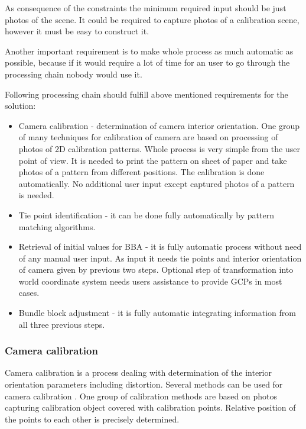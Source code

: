 \documentclass[a4paper,12pt]{article}
\begin{document}
As consequence of the constraints the minimum required input should be just photos
of the scene.
It could be required to capture photos of a calibration scene, however 
it must be easy to construct it. 

Another important requirement is to make whole process as much automatic as possible, 
because if it would require a lot of time for an user to go through the processing chain nobody would use it.


Following processing chain  \cite{labe2006automatic} should fulfill above mentioned requirements for the solution:

\begin{itemize}
\item Camera calibration - determination of camera interior orientation.  One group of many techniques for calibration
of camera are based on processing of photos of 2D calibration patterns. Whole process is very simple from the user point of view. It is needed 
to print the pattern on sheet of paper and take photos of a pattern from different positions. The calibration 
is done automatically. No additional user input except captured photos of a pattern is needed.
\item Tie point identification - it can be done fully automatically by pattern matching algorithms.
\item Retrieval of initial values for BBA - it is fully automatic process without need of any manual user input.
As input it needs tie points and interior orientation of camera given by previous two steps.
 Optional step of transformation into world coordinate system needs users assistance
 to provide GCPs \cite{heipke1997automation} in most cases.
\item Bundle block adjustment - it is fully automatic integrating information from all three previous steps.
\end{itemize}
 
 
\subsubsection{Camera calibration}


Camera calibration is a process dealing with determination of the interior orientation parameters including distortion.
Several methods can be used for camera calibration \cite{zhang2004calibration}. 
One group of calibration methods are based on photos capturing calibration object covered with calibration points.
Relative position of the points to each other is  precisely determined.  
\end{document}
